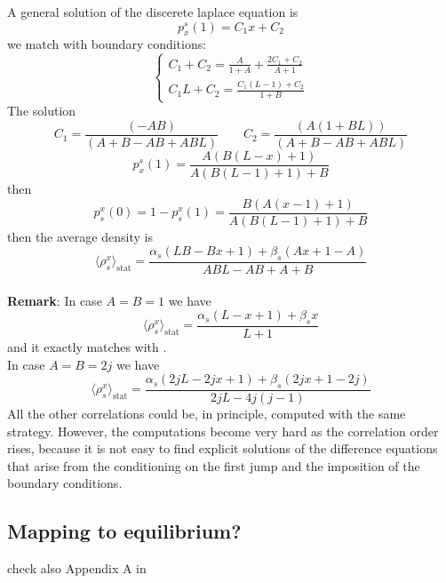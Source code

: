 \documentclass[11pt]{article}
\numberwithin{equation}{section}
\numberwithin{equation}{subsection}
\begin{document}
A general solution of the discerete laplace equation is
\begin{equation}
	p_{x}^{s}(1)=C_{1}x+C_{2}
\end{equation}
we match with boundary conditions:
\begin{equation}
	\begin{cases}
	C_{1}+C_{2}=\frac{A}{1+A}+\frac{2C_{1}+C_{2}}{A+1}\\
	C_{1}L+C_{2}=\frac{C_{1}(L-1)+C_{2}}{1+B}
	\end{cases}
\end{equation}
The solution
\begin{equation}
	C_{1}=\frac{(-A B)}{(A + B - A B + A B L)}\qquad C_{2}=\frac{(A (1 + B L))}{(A + B - A B + A B L)}
\end{equation}
\begin{equation}
	p_{x}^{s}(1)=\frac{A (B (L-x)+1)}{A (B (L-1)+1)+B}
\end{equation}
then 
\begin{equation}
	p^{x}_{s}(0)=1-p^{x}_{s}(1)=\frac{B (A (x-1)+1)}{A (B (L-1)+1)+B}
\end{equation}
then the average density is 
\begin{equation}
\langle\rho_{s}^{x}\rangle_{\text{stat}}=\frac{\alpha_{s}(LB-Bx+1)+\beta_{s}(Ax+1-A)}{ABL-AB+A+B}
\end{equation}
\newline \\
\textbf{Remark}: In case $A=B=1$ we have 
	\begin{equation}
\langle\rho_{s}^{x}\rangle_{\text{stat}}=\frac{\alpha_{s}(L-x+1)+\beta_{s}x}{L+1}
	\end{equation}
and it exactly matches with \cite{vanicat2017exact}. \\
In case $A=B=2j$ we have 
\begin{equation}
	\langle\rho_{s}^{x}\rangle_{\text{stat}}=\frac{\alpha_{s}(2jL-2jx+1)+\beta_{s}(2jx+1-2j)}{2jL-4j(j-1)}
\end{equation}
All the other correlations could be, in principle, computed with the same strategy. However, the computations become very hard as the correlation order rises, because it is not easy to find explicit solutions of the difference equations that arise from the conditioning on the first jump and the imposition of the boundary conditions. 
\subsection{Mapping to equilibrium?}
{\color{red}
check also Appendix A in
\cite{Alcaraz:1992zc} }
\end{document}
